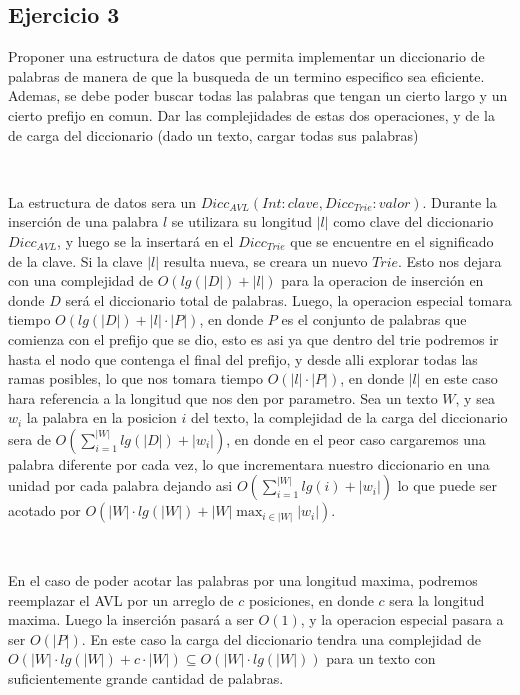 \documentclass[10pt, a4paper]{report}
\begin{document}
\subsection*{Ejercicio 3}

Proponer una estructura de datos que permita implementar un diccionario de palabras de manera de que la busqueda de un termino especifico sea eficiente. Ademas, se debe poder buscar todas las palabras que tengan un cierto largo y un cierto prefijo en comun. Dar las complejidades de estas dos operaciones, y de la de carga del diccionario (dado un texto, cargar todas sus palabras)

~

La estructura de datos sera un $Dicc_{AVL}(Int: clave, Dicc_{Trie}: valor)$. Durante la inserci\'on de una palabra $l$ se utilizara su longitud $|l|$ como clave del diccionario $Dicc_{AVL}$, y luego se la insertar\'a en el $Dicc_{Trie}$ que se encuentre en el significado de la clave. Si la clave $|l|$ resulta nueva, se creara un nuevo $Trie$. Esto nos dejara con una complejidad de $O(lg(|D|)+|l|)$ para la operacion de inserci\'on en donde $D$ ser\'a el diccionario total de palabras. Luego, la operacion especial tomara tiempo $O(lg(|D|)+|l| \cdot |P|)$, en donde $P$ es el conjunto de palabras que comienza con el prefijo que se dio, esto es asi ya que dentro del trie podremos ir hasta el nodo que contenga el final del prefijo, y desde alli explorar todas las ramas posibles, lo que nos tomara tiempo $O(|l| \cdot |P|)$, en donde $|l|$ en este caso hara referencia a la longitud que nos den por parametro. Sea un texto $W$, y sea $w_i$ la palabra en la posicion $i$ del texto, la complejidad de la carga del 
diccionario 
sera de $O(\sum_{i=1}^{|W|}lg(|D|)+|w_i|)$, en donde en el peor caso cargaremos una palabra diferente por cada vez, lo que incrementara nuestro diccionario en una unidad por cada palabra dejando asi $O(\sum_{i=1}^{|W|}lg(i)+|w_i|)$ lo que puede ser acotado por $O(|W|\cdot lg(|W|)+ |W| \max_{i \in |W|}|w_i|)$.

~

En el caso de poder acotar las palabras por una longitud maxima, podremos reemplazar el AVL por un arreglo de $c$ posiciones, en donde $c$ sera la longitud maxima. Luego la inserci\'on pasar\'a a ser $O(1)$, y la operacion especial pasara a ser $O(|P|)$. En este caso la carga del diccionario tendra una complejidad de $O(|W|\cdot lg(|W|)+ c \cdot |W|) \subseteq O(|W| \cdot lg(|W|))$ para un texto con suficientemente grande cantidad de palabras.
\end{document}
